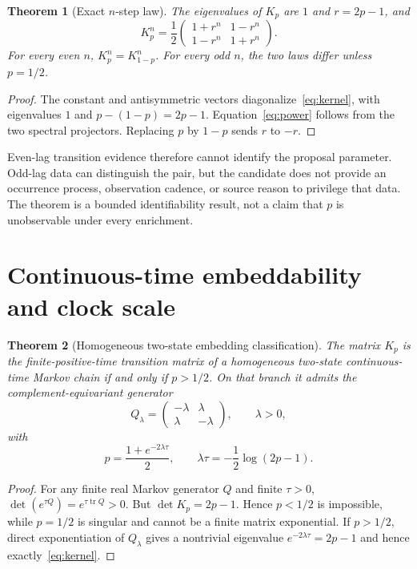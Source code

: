 \documentclass[11pt]{article}
\newtheorem{theorem}{Theorem}
\begin{document}
\begin{theorem}[Exact $n$-step law]
The eigenvalues of $K_p$ are $1$ and $r=2p-1$, and
\begin{equation}
 K_p^n=\frac12
 \begin{pmatrix}
  1+r^n&1-r^n\\
  1-r^n&1+r^n
 \end{pmatrix}.
 \label{eq:power}
\end{equation}
For every even $n$, $K_p^n=K_{1-p}^n$. For every odd $n$, the two laws differ
unless $p=1/2$.
\end{theorem}

\begin{proof}
The constant and antisymmetric vectors diagonalize~\eqref{eq:kernel}, with
eigenvalues $1$ and $p-(1-p)=2p-1$. Equation~\eqref{eq:power} follows from
the two spectral projectors. Replacing $p$ by $1-p$ sends $r$ to $-r$.
\end{proof}

Even-lag transition evidence therefore cannot identify the proposal parameter.
Odd-lag data can distinguish the pair, but the candidate does not provide an
occurrence process, observation cadence, or source reason to privilege that
data. The theorem is a bounded identifiability result, not a claim that $p$ is
unobservable under every enrichment.

\section{Continuous-time embeddability and clock scale}

\begin{theorem}[Homogeneous two-state embedding classification]
The matrix $K_p$ is the finite-positive-time transition matrix of a homogeneous
two-state continuous-time Markov chain if and only if $p>1/2$. On that branch
it admits the complement-equivariant generator
\[
 Q_\lambda=\begin{pmatrix}-\lambda&\lambda\\
 \lambda&-\lambda\end{pmatrix},\qquad \lambda>0,
\]
with
\begin{equation}
 p=\frac{1+e^{-2\lambda\tau}}2,
 \qquad
 \lambda\tau=-\frac12\log(2p-1).
 \label{eq:clock}
\end{equation}
\end{theorem}

\begin{proof}
For any finite real Markov generator $Q$ and finite $\tau>0$,
$\det(e^{\tau Q})=e^{\tau\operatorname{tr}Q}>0$. But
$\det K_p=2p-1$. Hence $p<1/2$ is impossible, while $p=1/2$ is singular and
cannot be a finite matrix exponential. If $p>1/2$, direct exponentiation of
$Q_\lambda$ gives a nontrivial eigenvalue $e^{-2\lambda\tau}=2p-1$ and hence
exactly~\eqref{eq:kernel}.
\end{proof}
\end{document}

